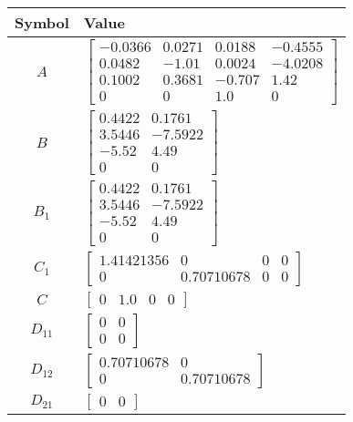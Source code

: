 \begin{tabular}{cl}
\hline
  Symbol  & Value                                                                                                                                                             \\
\hline
   $A$    & $\left[\begin{matrix}-0.0366 & 0.0271 & 0.0188 & -0.4555\\0.0482 & -1.01 & 0.0024 & -4.0208\\0.1002 & 0.3681 & -0.707 & 1.42\\0 & 0 & 1.0 & 0\end{matrix}\right]$ \\
   $B$    & $\left[\begin{matrix}0.4422 & 0.1761\\3.5446 & -7.5922\\-5.52 & 4.49\\0 & 0\end{matrix}\right]$                                                                   \\
 $B_{1}$  & $\left[\begin{matrix}0.4422 & 0.1761\\3.5446 & -7.5922\\-5.52 & 4.49\\0 & 0\end{matrix}\right]$                                                                   \\
 $C_{1}$  & $\left[\begin{matrix}1.41421356 & 0 & 0 & 0\\0 & 0.70710678 & 0 & 0\end{matrix}\right]$                                                                           \\
   $C$    & $\left[\begin{matrix}0 & 1.0 & 0 & 0\end{matrix}\right]$                                                                                                          \\
 $D_{11}$ & $\left[\begin{matrix}0 & 0\\0 & 0\end{matrix}\right]$                                                                                                             \\
 $D_{12}$ & $\left[\begin{matrix}0.70710678 & 0\\0 & 0.70710678\end{matrix}\right]$                                                                                           \\
 $D_{21}$ & $\left[\begin{matrix}0 & 0\end{matrix}\right]$                                                                                                                    \\
\hline
\end{tabular}